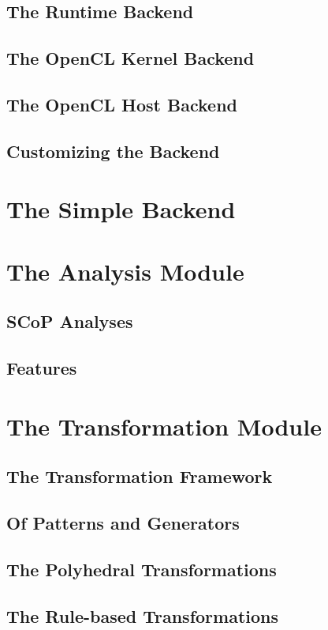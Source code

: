 \subsection{The Runtime Backend}
\subsection{The OpenCL Kernel Backend}
\subsection{The OpenCL Host Backend}
\subsection{Customizing the Backend}

\section{The Simple Backend}

\section{The Analysis Module}
\subsection{SCoP Analyses}
\subsection{Features}

\section{The Transformation Module}
\subsection{The Transformation Framework}
\subsection{Of Patterns and Generators}
\label{sec:Compiler.Transform.Pattern}
\subsection{The Polyhedral Transformations}
\subsection{The Rule-based Transformations}

